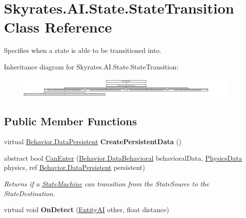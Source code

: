 \hypertarget{class_skyrates_1_1_a_i_1_1_state_1_1_state_transition}{\section{Skyrates.\-A\-I.\-State.\-State\-Transition Class Reference}
\label{class_skyrates_1_1_a_i_1_1_state_1_1_state_transition}
}


Specifies when a state is able to be transitioned into.  


Inheritance diagram for Skyrates.\-A\-I.\-State.\-State\-Transition\-:\begin{figure}[H]
\begin{center}
\leavevmode
\includegraphics[height=1.054118cm]{class_skyrates_1_1_a_i_1_1_state_1_1_state_transition}
\end{center}
\end{figure}
\subsection*{Public Member Functions}
\begin{DoxyCompactItemize}
\item 
\hypertarget{class_skyrates_1_1_a_i_1_1_state_1_1_state_transition_a7adfa94373a575af09f86e8f1161a3a8}{virtual \hyperlink{class_skyrates_1_1_a_i_1_1_behavior_1_1_data_persistent}{Behavior.\-Data\-Persistent} {\bfseries Create\-Persistent\-Data} ()}\label{class_skyrates_1_1_a_i_1_1_state_1_1_state_transition_a7adfa94373a575af09f86e8f1161a3a8}

\item 
abstract bool \hyperlink{class_skyrates_1_1_a_i_1_1_state_1_1_state_transition_a774f9f4ee740450b5b41f565f158be88}{Can\-Enter} (\hyperlink{class_skyrates_1_1_a_i_1_1_behavior_1_1_data_behavioral}{Behavior.\-Data\-Behavioral} behavioral\-Data, \hyperlink{class_skyrates_1_1_physics_1_1_physics_data}{Physics\-Data} physics, ref \hyperlink{class_skyrates_1_1_a_i_1_1_behavior_1_1_data_persistent}{Behavior.\-Data\-Persistent} persistent)
\begin{DoxyCompactList}\small\item\em Returns if a \hyperlink{class_skyrates_1_1_a_i_1_1_state_1_1_state_machine}{State\-Machine} can transition from the State\-Source to the State\-Destination. \end{DoxyCompactList}\item 
\hypertarget{class_skyrates_1_1_a_i_1_1_state_1_1_state_transition_a68494fbd56a9103d424d57aaf4186ee6}{virtual void {\bfseries On\-Detect} (\hyperlink{class_skyrates_1_1_entity_1_1_entity_a_i}{Entity\-A\-I} other, float distance)}\label{class_skyrates_1_1_a_i_1_1_state_1_1_state_transition_a68494fbd56a9103d424d57aaf4186ee6}

\end{DoxyCompactItemize}


